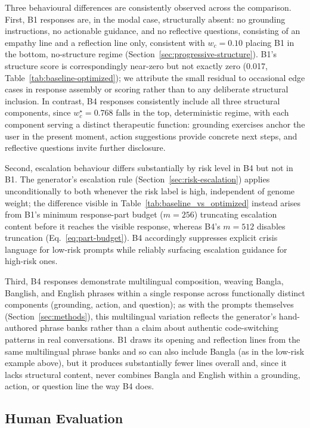 \documentclass[mathematics,article,submit,xetex,moreauthors]{Definitions/mdpi}
\begin{document}
Three behavioural differences are consistently observed across the
comparison. First, B1 responses are, in the modal case, structurally
absent: no grounding instructions, no actionable guidance, and no
reflective questions, consisting of an empathy line and a reflection line
only, consistent with $w_c=0.10$ placing B1 in the bottom, no-structure
regime (Section~\ref{sec:progressive-structure}). B1's structure score is
correspondingly near-zero but not exactly zero (0.017,
Table~\ref{tab:baseline-optimized}); we attribute the small residual to
occasional edge cases in response assembly or scoring rather than to any
deliberate structural inclusion.
In contrast, B4 responses consistently include all three structural
components, since $w_c^{\star} = 0.768$ falls in the top, deterministic
regime, with each component serving a distinct therapeutic function:
grounding exercises anchor the user in the present moment, action
suggestions provide concrete next steps, and reflective questions invite
further disclosure.

Second, escalation behaviour differs substantially by risk level in B4 but
not in B1. The generator's escalation rule
(Section~\ref{sec:risk-escalation}) applies unconditionally to both
whenever the risk label is high, independent of genome weight; the
difference visible in Table~\ref{tab:baseline_vs_optimized} instead arises
from B1's minimum response-part budget ($m=256$) truncating escalation
content before it reaches the visible response, whereas B4's $m=512$
disables truncation (Eq.~\eqref{eq:part-budget}). B4 accordingly suppresses
explicit crisis language for low-risk prompts while reliably surfacing
escalation guidance for high-risk ones.

Third, B4 responses demonstrate multilingual composition,
weaving Bangla, Banglish, and English phrases within
a single response across functionally distinct components (grounding,
action, and question); as with the prompts themselves
(Section~\ref{sec:methods}), this multilingual variation reflects the
generator's hand-authored phrase banks rather than a claim about
authentic code-switching patterns in real conversations. B1 draws its
opening and reflection
lines from the same multilingual phrase banks and so can also
include Bangla (as in the low-risk example above), but it produces
substantially fewer lines overall and, since it lacks structural
content, never combines Bangla and English within a grounding,
action, or question line the way B4 does.

\subsection{Human Evaluation}
\label{sec:human_eval}
\end{document}
